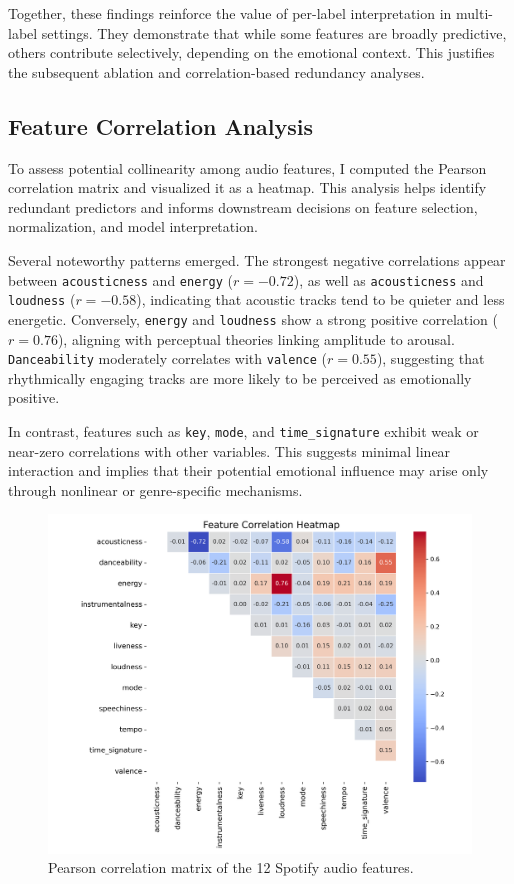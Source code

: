 \documentclass{article}
\begin{document}
Together, these findings reinforce the value of per-label interpretation in multi-label settings. They demonstrate that while some features are broadly predictive, others contribute selectively, depending on the emotional context. This justifies the subsequent ablation and correlation-based redundancy analyses.

\subsection{Feature Correlation Analysis}

To assess potential collinearity among audio features, I computed the Pearson correlation matrix and visualized it as a heatmap. This analysis helps identify redundant predictors and informs downstream decisions on feature selection, normalization, and model interpretation.

Several noteworthy patterns emerged. The strongest negative correlations appear between \texttt{acousticness} and \texttt{energy} ($r = -0.72$), as well as \texttt{acousticness} and \texttt{loudness} ($r = -0.58$), indicating that acoustic tracks tend to be quieter and less energetic. Conversely, \texttt{energy} and \texttt{loudness} show a strong positive correlation ($r = 0.76$), aligning with perceptual theories linking amplitude to arousal. \texttt{Danceability} moderately correlates with \texttt{valence} ($r = 0.55$), suggesting that rhythmically engaging tracks are more likely to be perceived as emotionally positive.

In contrast, features such as \texttt{key}, \texttt{mode}, and \texttt{time\_signature} exhibit weak or near-zero correlations with other variables. This suggests minimal linear interaction and implies that their potential emotional influence may arise only through nonlinear or genre-specific mechanisms.

\begin{figure}[H]
\centering
\includegraphics[width=\textwidth]{Graphics/feature_correlation.png}
\caption{Pearson correlation matrix of the 12 Spotify audio features.}
\label{fig:feature_correlation}
\end{figure}
\end{document}
